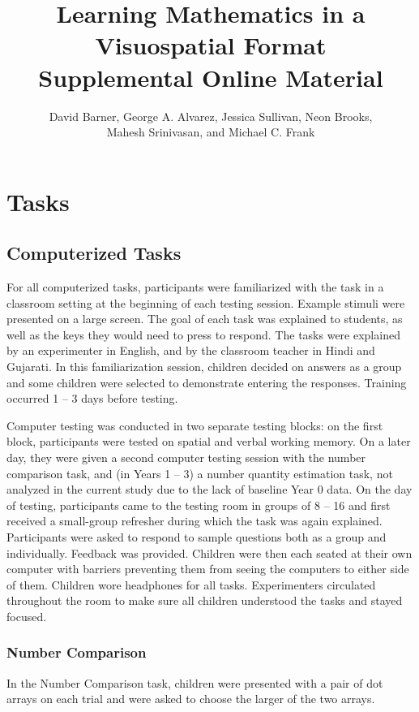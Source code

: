 \documentclass[11pt]{article}
\title{Learning Mathematics in a Visuospatial Format\\ Supplemental Online Material}
\author{David Barner, George A. Alvarez, Jessica Sullivan, Neon Brooks, \\ Mahesh Srinivasan, and Michael C. Frank}
\date{}
\begin{document}
\maketitle
\tableofcontents
\newpage

\section{Tasks}

\subsection{Computerized Tasks}

For all computerized tasks, participants were familiarized with the task in a classroom setting at the beginning of each testing session. Example stimuli were presented on a large screen. The goal of each task was explained to students, as well as the keys they would need to press to respond. The tasks were explained by an experimenter in English, and by the classroom teacher in Hindi and Gujarati. In this familiarization session, children decided on answers as a group and some children were selected to demonstrate entering the responses. Training occurred 1 -- 3 days before testing. 

Computer testing was conducted in two separate testing blocks: on the first block, participants were tested on spatial and verbal working memory. On a later day, they were given a second computer testing session with the number comparison task, and (in Years 1 -- 3) a number quantity estimation task, not analyzed in the current study due to the lack of baseline Year 0 data. On the day of testing, participants came to the testing room in groups of 8 -- 16 and first received a small-group refresher during which the task was again explained.  Participants were asked to respond to sample questions both as a group and individually. Feedback was provided. Children were then each seated at their own computer with barriers preventing them from seeing the computers to either side of them. Children wore headphones for all tasks. Experimenters circulated throughout the room to make sure all children understood the tasks and stayed focused.

\subsubsection{Number Comparison}

In the Number Comparison task, children were presented with a pair of dot arrays on each trial and were asked to choose the larger of the two arrays. 
\end{document}
